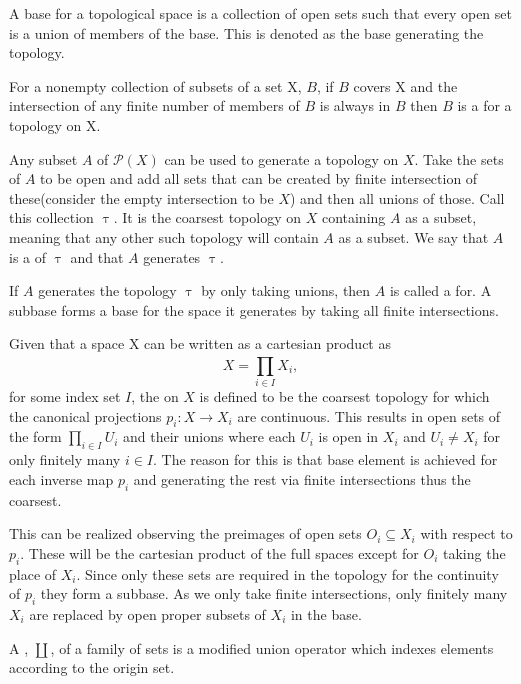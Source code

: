 \documentclass[../../main.tex]{subfiles}
\begin{document}
    A base for a topological space is a collection of open sets such that every open set is a union of members of the base. This is denoted as the base generating the topology.
    
    \begin{definition}
        For a nonempty collection of subsets of a set X, $B$, if $B$ covers X and the intersection of any finite number of members of $B$ is always in $B$ then $B$ is a  for a topology on X.
    \end{definition}
    
    Any subset $A$ of $\mathcal{P}(X)$ can be used to generate a topology on $X$. Take the sets of $A$ to be open and add all sets that can be created by finite intersection of these(consider the empty intersection to be $X$) and then all unions of those. Call this collection $\uptau$. It is the coarsest topology on $X$ containing $A$ as a subset, meaning that any other such topology will contain $A$ as a subset. We say that $A$ is a  of $\uptau$ and that $A$ generates $\uptau$. 
    
    If $A$ generates the topology $\uptau$ by only taking unions, then $A$ is called a  for. A subbase forms a base for the space it generates by taking all finite intersections.
    
    \begin{definition}
        Given that a space X can be written as a cartesian product as $$X=\prod_{i\in I}^{}X_i,$$ for some index set $I$, the  on $X$ is defined to be the coarsest topology for which the canonical projections $p_i:X\to X_i$ are continuous. This results in open sets of the form $ \prod_{i\in I}U_i$ and their unions where each $U_i$ is open in $X_i$ and $U_i \ne X_i$ for only finitely many $i\in I$. The reason for this is that  base element is achieved for each inverse map $p_i$ and generating the rest via finite intersections thus the coarsest.
    \end{definition}
    
    This can be realized observing the preimages of open sets $O_i \subseteq X_i$ with respect to $p_i$. These will be the cartesian product of the full spaces except for $O_i$ taking the place of $X_i$. Since only these sets are required in the topology for the continuity of $p_i$ they form a subbase. As we only take finite intersections, only finitely many $X_i$ are replaced by open proper subsets of $X_i$ in the base.
    
    \begin{definition}
        A , $\coprod$, of a family of sets is a modified union operator which indexes elements according to the origin set. 
    \end{definition}
    
\end{document}
